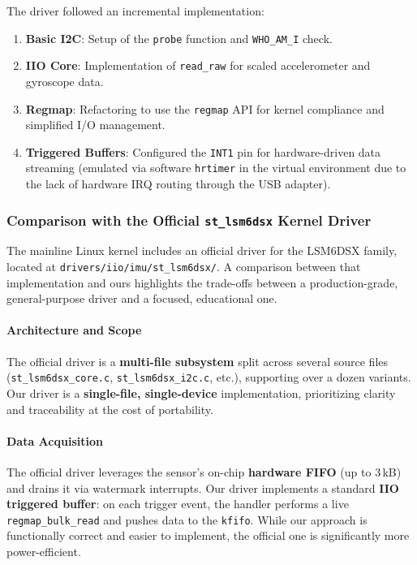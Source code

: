 \documentclass[10pt,a4paper]{article}
\begin{document}
The driver followed an incremental implementation:
\begin{enumerate}
    \item \textbf{Basic I2C}: Setup of the \texttt{probe} function and \texttt{WHO\_AM\_I} check.
    \item \textbf{IIO Core}: Implementation of \texttt{read\_raw} for scaled accelerometer and gyroscope data.
    \item \textbf{Regmap}: Refactoring to use the \texttt{regmap} API for kernel compliance and simplified I/O management.
    \item \textbf{Triggered Buffers}: Configured the \texttt{INT1} pin for hardware-driven data streaming (emulated via software \texttt{hrtimer} in the virtual environment due to the lack of hardware IRQ routing through the USB adapter).
\end{enumerate}

\subsubsection{Comparison with the Official \texttt{st\_lsm6dsx} Kernel Driver}

The mainline Linux kernel includes an official driver for the LSM6DSX family, located at \texttt{drivers/iio/imu/st\_lsm6dsx/}. A comparison between that implementation and ours highlights the trade-offs between a production-grade, general-purpose driver and a focused, educational one.

\paragraph{Architecture and Scope}
The official driver is a \textbf{multi-file subsystem} split across several source files (\texttt{st\_lsm6dsx\_core.c}, \texttt{st\_lsm6dsx\_i2c.c}, etc.), supporting over a dozen variants. Our driver is a \textbf{single-file, single-device} implementation, prioritizing clarity and traceability at the cost of portability.

\paragraph{Data Acquisition}
The official driver leverages the sensor's on-chip \textbf{hardware FIFO} (up to 3\,kB) and drains it via watermark interrupts. Our driver implements a standard \textbf{IIO triggered buffer}: on each trigger event, the handler performs a live \texttt{regmap\_bulk\_read} and pushes data to the \texttt{kfifo}. While our approach is functionally correct and easier to implement, the official one is significantly more power-efficient.
\end{document}
